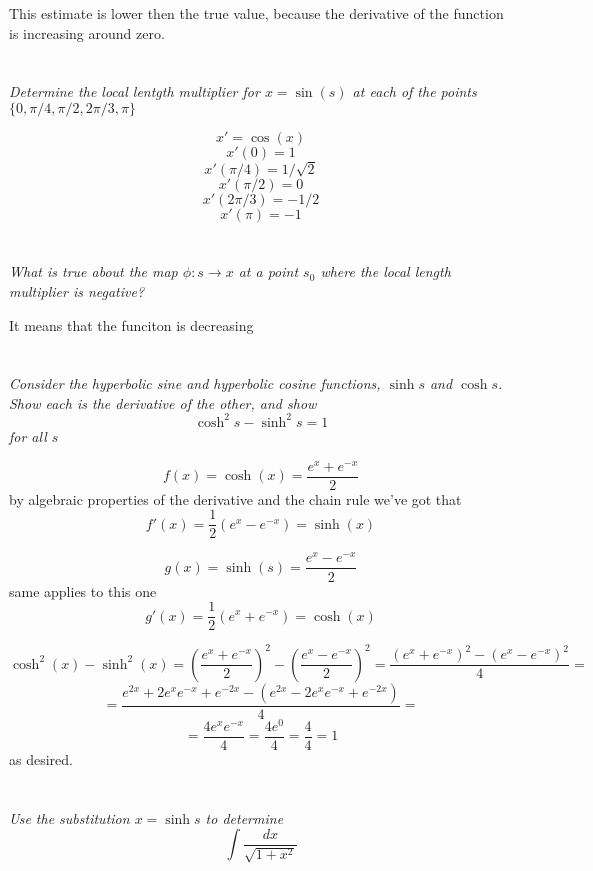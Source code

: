 \documentclass[11pt,oneside,titlepage]{book}
\begin{document}
This estimate is lower then the true value, because the derivative of the function is increasing
around zero.

\section{}

\textit{Determine the local lentgth multiplier for $x = \sin(s)$ at each of the
  points $\{0, \pi/4, \pi/2, 2\pi/3, \pi\}$}

$$x' = \cos(x)$$
$$x'(0) = 1$$
$$x'(\pi/4) = 1/\sqrt{2}$$
$$x'(\pi/2) = 0$$
$$x'(2 \pi/3) = -1/2$$
$$x'(\pi) = -1$$

\section{}

\textit{What is true about the map $\phi: s \to x$ at a point $s_0$ where the local length
  multiplier is negative?}

It means that the funciton is decreasing

\section{}

\textit{Consider the hyperbolic sine and hyperbolic cosine functions, $\sinh s$ and
  $\cosh s$. Show each is the derivative of the other, and show }
$$\cosh^2 s - \sinh^2 s = 1$$
\textit{for all $s$}

$$f(x) = \cosh(x) = \frac{e^x + e^{-x}}{2}$$
by algebraic properties of the derivative and the chain rule we've got that
$$f'(x) = \frac{1}{2}(e^x - e^{-x}) = \sinh(x)$$

$$g(x) = \sinh(s) = \frac{e^x - e^{-x}}{2}$$
same applies to this one
$$g'(x) = \frac{1}{2}(e^x +  e^{-x}) = \cosh(x)$$

$$\cosh^2(x) - \sinh^2(x) = \left(\frac{e^x + e^{-x}}{2} \right)^2 -
\left(\frac{e^x - e^{-x}}{2} \right)^2 = 
\frac{(e^x + e^{-x})^2 - (e^x - e^{-x})^2}{4} = 
$$
$$ =
\frac{e^{2x} + 2e^xe^{-x} + e^{-2x} - (e^{2x} - 2e^xe^{-x} + e^{-2x})}{4} =
$$
$$ =
\frac{4e^xe^{-x}}{4} = \frac{4e^0}{4} = \frac{4}{4} = 1
$$
as desired.

\section{}

\textit{Use the substitution $x = \sinh s$ to determine }
$$\int{\frac{dx}{\sqrt{1 + x^2}}}$$
\end{document}
